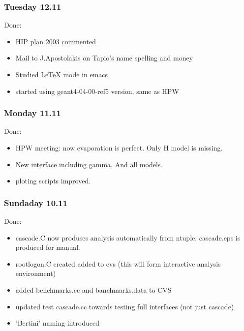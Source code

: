 \subsubsection{Tuesday 12.11}

Done:

\begin{itemize}

\item HIP plan 2003 commented

\item Mail to J.Apostolakis on Tapio's name spelling and money

\item Studied LeTeX mode in emacs

\item started using geant4-04-00-ref5 version, 
same as HPW

\end{itemize}


\subsubsection{Monday 11.11}

Done:

\begin{itemize}

\item HPW meeting: now evaporation is perfect. 
Only H model is
  missing.

\item New interface including gamma. 
And all models.

\item ploting scripts improved.

\end{itemize}

\subsubsection{Sundaday 10.11}

Done:
\begin{itemize}
\item cascade.C now produses analysis automatically from ntuple.
  cascade.eps is produced for manual.
\item rootlogon.C created added to cvs (this will form interactive
  analysis environment)
\item added benchmarks.cc and banchmarks.data to CVS
\item updated test cascade.cc towards testing full interfaces (not
  just cascade)
\item 'Bertini' naming introduced
\end{itemize}

